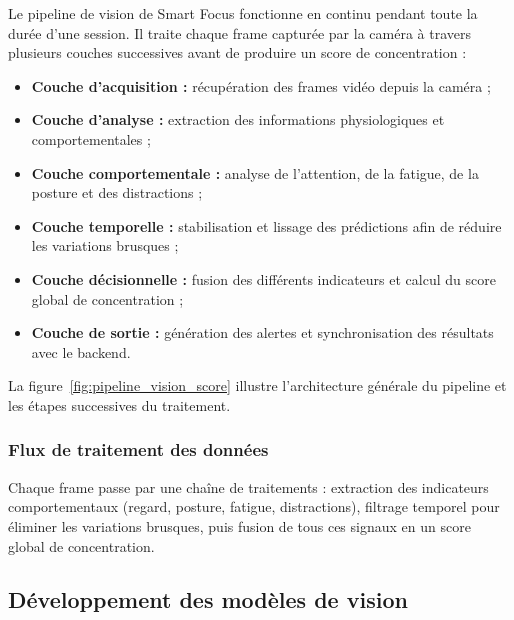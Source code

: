 Le pipeline de vision de Smart Focus fonctionne en continu pendant toute la durée d’une session. Il traite chaque frame capturée par la caméra à travers plusieurs couches successives avant de produire un score de concentration :

\begin{itemize}
    \item \textbf{Couche d’acquisition :} récupération des frames vidéo depuis la caméra ;
    
    \item \textbf{Couche d’analyse :} extraction des informations physiologiques et comportementales ;
    
    \item \textbf{Couche comportementale :} analyse de l’attention, de la fatigue, de la posture et des distractions ;
    
    \item \textbf{Couche temporelle :} stabilisation et lissage des prédictions afin de réduire les variations brusques ;
    
    \item \textbf{Couche décisionnelle :} fusion des différents indicateurs et calcul du score global de concentration ;
    
    \item \textbf{Couche de sortie :} génération des alertes et synchronisation des résultats avec le backend.
\end{itemize}

La figure~\ref{fig:pipeline_vision_score} illustre l’architecture générale du pipeline et les étapes successives du traitement.

\subsubsection{Flux de traitement des données}

Chaque frame passe par une chaîne de traitements : extraction des indicateurs comportementaux (regard, posture, fatigue, distractions), filtrage temporel pour éliminer les variations brusques, puis fusion de tous ces signaux en un score global de concentration.

\subsection{Développement des modèles de vision}

